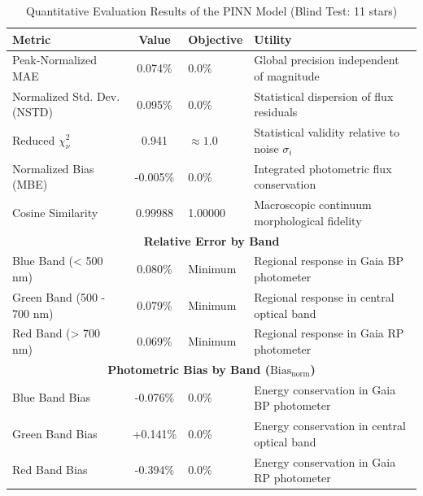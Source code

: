 
\begin{table}[htpb]
\centering
\caption{Quantitative Evaluation Results of the PINN Model (Blind Test: 11 stars)}
\label{tab:pinn_evaluation}
\begin{tabular}{lcll}
\hline
\textbf{Metric} & \textbf{Value} & \textbf{Objective} & \textbf{Utility} \\
\hline
Peak-Normalized MAE & 0.074\% & 0.0\% & Global precision independent of magnitude \\
Normalized Std. Dev. (NSTD) & 0.095\% & 0.0\% & Statistical dispersion of flux residuals \\
Reduced $\chi^2_\nu$ & 0.941 & $\approx 1.0$ & Statistical validity relative to noise $\sigma_i$ \\
Normalized Bias (MBE) & -0.005\% & 0.0\% & Integrated photometric flux conservation \\
Cosine Similarity & 0.99988 & 1.00000 & Macroscopic continuum morphological fidelity \\
\hline
\multicolumn{4}{c}{\textbf{Relative Error by Band}} \\
\hline
Blue Band (< 500 nm) & 0.080\% & Minimum & Regional response in Gaia BP photometer \\
Green Band (500 - 700 nm) & 0.079\% & Minimum & Regional response in central optical band \\
Red Band (> 700 nm) & 0.069\% & Minimum & Regional response in Gaia RP photometer \\
\hline
\multicolumn{4}{c}{\textbf{Photometric Bias by Band ($\text{Bias}_{\text{norm}}$)}} \\
\hline
Blue Band Bias & -0.076\% & 0.0\% & Energy conservation in Gaia BP photometer \\
Green Band Bias & +0.141\% & 0.0\% & Energy conservation in central optical band \\
Red Band Bias & -0.394\% & 0.0\% & Energy conservation in Gaia RP photometer \\
\hline
\end{tabular}
\end{table}
